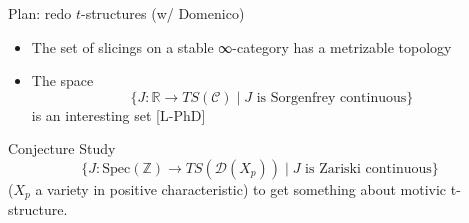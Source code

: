 \documentclass{beamer}
\def\lnk#1{\href{#1}{\faFilePdfO}}
\begin{document}
\begin{frame}{Plan: redo $t$-structures (w/ Domenico)}\small
   \begin{itemize}
     \item<+-> The set of \alert{slicings} on a stable ∞-category has a metrizable topology

     \item<+-> The space \[\{ J \colon \mathbb R \to TS(\mathcal C) \mid J \text{ is Sorgenfrey continuous} \}\]
     is an interesting set [\alert{L-PhD}\lnk{http://tetrapharmakon.github.io/stuff/main.pdf}]
    \end{itemize}

    \onslide<+->
    \begin{block}{Conjecture}
\vspace{.5mm}
  Study
\[\{ J \colon \text{Spec}(\mathbb Z) \to TS(\mathcal D(X_p)) \mid J \text{ is Zariski continuous} \}\]
($X_p$ a variety in positive characteristic) to get something about motivic t-structure.
 \end{block}
\end{frame}
%
%
%
%
\end{document}
